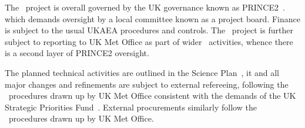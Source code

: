 \begin{enumerate}
The \nep \ project is overall governed by the UK governance known as PRINCE2~\cite{prince2,prince2wiki}.
which demands oversight by a local committee known as a project board.
Finance is subject to the usual UKAEA procedures and controls.
The \nep \ project is further subject to
reporting to UK Met Office as part of wider \exc \ activities, whence there is a
second layer of PRINCE2 oversight.

The planned technical activities are outlined in the Science Plan~\cite{sciplan},
it and all  major changes and refinements are subject to external refereeing,
following the \exc \ procedures drawn up by UK Met Office consistent with the 
demands of the UK Strategic Priorities Fund~\cite{SPF}.
External procurements similarly follow the \exc \ procedures drawn up by UK Met Office.
\end{enumerate}

